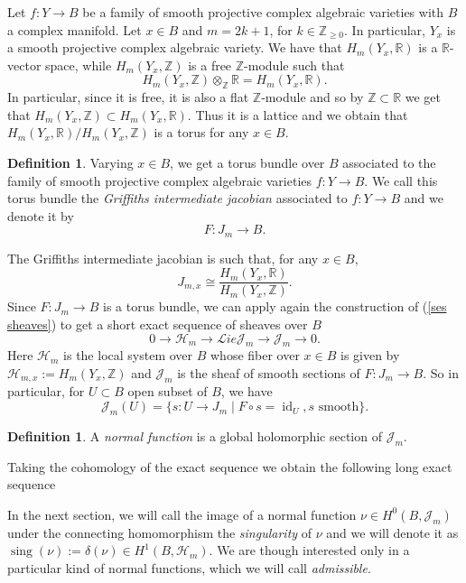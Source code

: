 \documentclass[a4paper,12 pt,titlepage,twoside]{book}
\newcommand{\numberset}{\mathbb}
\newcommand{\Z}{\numberset{Z}}
\newcommand{\R}{\numberset{R}}
\newcommand{\Lie}{\mathcal{L}ie}
\DeclareMathOperator{\id}{id}
\DeclareMathOperator{\sing}{sing}
\theoremstyle{plain}
\theoremstyle{theorem}
\theoremstyle{definition}
\newtheorem{defn}[thm]{Definition}
\theoremstyle{remark}
\begin{document}
	Let $f \colon Y \rightarrow B$ be a family of smooth projective complex algebraic varieties with $B$ a complex manifold. Let $x \in B$ and $m = 2k+1$, for $k \in \Z_{\ge 0}.$ In particular, $Y_x$ is a smooth projective complex algebraic variety. We have that $H_m(Y_x, \R)$ is a $\R$-vector space, while $H_m(Y_x,\Z)$ is a free $\Z$-module such that $$H_m(Y_x,\Z) \otimes_\Z \R = H_m(Y_x,\R).$$ In particular, since it is free, it is also a flat $\Z$-module and so by $\Z \subset \R$ we get that $H_m(Y_x,\Z) \subset H_m(Y_x,\R).$ Thus it is a lattice and we obtain that $H_m(Y_x,\R)/H_m(Y_x,\Z)$ is a torus for any $x \in B$.
	\begin{defn}
		Varying $x \in B$, we get a torus bundle over $B$ associated to the family of smooth projective complex algebraic varieties $f \colon Y \rightarrow B$. We call this torus bundle the \emph{Griffiths intermediate jacobian} associated to $f \colon Y \rightarrow B$ and we denote it by $$F \colon J_m \rightarrow B.$$
	\end{defn}
	The Griffiths intermediate jacobian is such that, for any $x \in B$, $$J_{m,x} \cong \frac{H_m(Y_x,\R)}{H_m(Y_x,\Z)}.$$ Since $F \colon J_m \rightarrow B$ is a torus bundle, we can apply again the construction of (\ref{ses sheaves}) to get a short exact sequence of sheaves over $B$ $$0 \rightarrow \mathcal{H}_m \rightarrow \Lie \mathcal{J}_m \rightarrow \mathcal{J}_m \rightarrow 0.$$ Here $\mathcal{H}_m$ is the local system over $B$ whose fiber over $x \in B$ is given by $\mathcal{H}_{m,x} := H_m(Y_x, \Z)$ and $\mathcal{J}_m$ is the sheaf of smooth sections of $F\colon J_m \rightarrow B$. So in particular, for $U \subset B$ open subset of $B$, we have $$\mathcal{J}_m(U) = \{s \colon U \rightarrow J_m \mid F \circ s = \id_U, s \text{ smooth}\}.$$
	\begin{defn}
		A \emph{normal function} is a global holomorphic section of $\mathcal{J}_m.$
	\end{defn}
	Taking the cohomology of the exact sequence we obtain the following long exact sequence
	\begin{center}
	\end{center}
	In the next section, we will call the image of a normal function $\nu \in H^0(B, \mathcal{J}_m)$ under the connecting homomorphism the \emph{singularity} of $\nu$ and we will denote it as $\sing(\nu) := \delta(\nu) \in H^1(B, \mathcal{H}_m).$ We are though interested only in a particular kind of normal functions, which we will call \emph{admissible}. 
\end{document}

